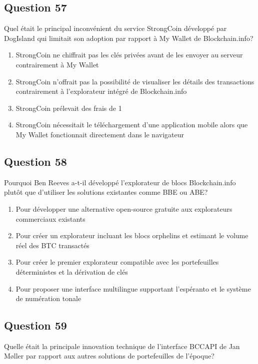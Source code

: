 \documentclass[12pt,a4paper]{article}
\begin{document}
\bigskip


\subsection*{Question 57}
Quel était le principal inconvénient du service StrongCoin développé par DogIsland qui limitait son adoption par rapport à My Wallet de Blockchain.info?

\begin{enumerate}[label=\Alph*., leftmargin=*]
\item StrongCoin ne chiffrait pas les clés privées avant de les envoyer au serveur contrairement à My Wallet
\item StrongCoin n'offrait pas la possibilité de visualiser les détails des transactions contrairement à l'explorateur intégré de Blockchain.info
\item StrongCoin prélevait des frais de 1%
\item StrongCoin nécessitait le téléchargement d'une application mobile alors que My Wallet fonctionnait directement dans le navigateur
\end{enumerate}

\bigskip


\subsection*{Question 58}
Pourquoi Ben Reeves a-t-il développé l'explorateur de blocs Blockchain.info plutôt que d'utiliser les solutions existantes comme BBE ou ABE?

\begin{enumerate}[label=\Alph*., leftmargin=*]
\item Pour développer une alternative open-source gratuite aux explorateurs commerciaux existants
\item Pour créer un explorateur incluant les blocs orphelins et estimant le volume réel des BTC transactés
\item Pour créer le premier explorateur compatible avec les portefeuilles déterministes et la dérivation de clés
\item Pour proposer une interface multilingue supportant l'espéranto et le système de numération tonale
\end{enumerate}

\bigskip


\subsection*{Question 59}
Quelle était la principale innovation technique de l'interface BCCAPI de Jan Møller par rapport aux autres solutions de portefeuilles de l'époque?
\end{document}
